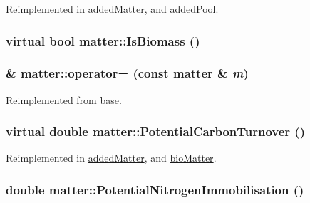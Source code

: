 Reimplemented in \hyperlink{classadded_matter_a124a49cad0765fff9147d7cb3e3f768e}{addedMatter}, and \hyperlink{classadded_pool_afdb519f965dcf836634edfa30752d888}{addedPool}.\hypertarget{classmatter_af64df31f0243674868c26be217d8decf}{
\subsubsection[{IsBiomass}]{\setlength{\rightskip}{0pt plus 5cm}virtual bool matter::IsBiomass ()}}
\label{classmatter_af64df31f0243674868c26be217d8decf}
\hypertarget{classmatter_a7e74962a5eb9280b2a259c9b908ded79}{
\subsubsection[{operator=}]{\& matter::operator= (const {\bf matter} \& {\em m})}}
\label{classmatter_a7e74962a5eb9280b2a259c9b908ded79}


Reimplemented from \hyperlink{classbase_abd18e2130f975aacfde1833ad137e3c5}{base}.\hypertarget{classmatter_ad8531740a6494ac68f0223cd49d272eb}{
\subsubsection[{PotentialCarbonTurnover}]{\setlength{\rightskip}{0pt plus 5cm}virtual double matter::PotentialCarbonTurnover ()}}
\label{classmatter_ad8531740a6494ac68f0223cd49d272eb}


Reimplemented in \hyperlink{classadded_matter_ac3cf951aba3e5001b9e7d582084863bf}{addedMatter}, and \hyperlink{classbio_matter_a3aed8f9e9d66c1c12491ace5f15439f5}{bioMatter}.\hypertarget{classmatter_a302a5c72c1cbe1c3d62f01d07f25cd4c}{
\subsubsection[{PotentialNitrogenImmobilisation}]{\setlength{\rightskip}{0pt plus 5cm}double matter::PotentialNitrogenImmobilisation ()}}
\label{classmatter_a302a5c72c1cbe1c3d62f01d07f25cd4c}


